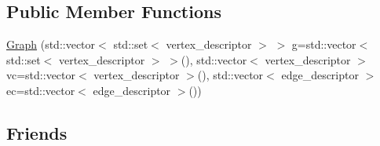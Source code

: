 \subsection*{\-Public \-Member \-Functions}
\begin{DoxyCompactItemize}
\item 
\hyperlink{classGraph_ae64b6895be33261c92746a392b58539f}{\-Graph} (std\-::vector$<$ std\-::set$<$ vertex\-\_\-descriptor $>$ $>$ g=std\-::vector$<$ std\-::set$<$ vertex\-\_\-descriptor $>$ $>$(), std\-::vector$<$ vertex\-\_\-descriptor $>$ vc=std\-::vector$<$ vertex\-\_\-descriptor $>$(), std\-::vector$<$ edge\-\_\-descriptor $>$ ec=std\-::vector$<$ edge\-\_\-descriptor $>$())
\end{DoxyCompactItemize}
\subsection*{\-Friends}
